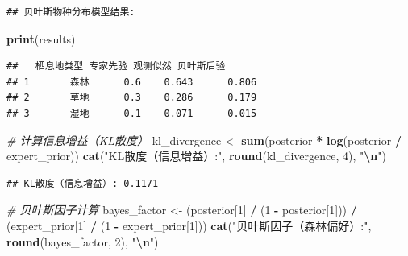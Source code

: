 \documentclass[
]{book}
\newenvironment{Shaded}{\begin{snugshade}}{\end{snugshade}}
\newcommand{\CommentTok}[1]{\textcolor[rgb]{0.56,0.35,0.01}{\textit{#1}}}
\newcommand{\DecValTok}[1]{\textcolor[rgb]{0.00,0.00,0.81}{#1}}
\newcommand{\FunctionTok}[1]{\textcolor[rgb]{0.13,0.29,0.53}{\textbf{#1}}}
\newcommand{\NormalTok}[1]{#1}
\newcommand{\OtherTok}[1]{\textcolor[rgb]{0.56,0.35,0.01}{#1}}
\newcommand{\SpecialCharTok}[1]{\textcolor[rgb]{0.81,0.36,0.00}{\textbf{#1}}}
\newcommand{\StringTok}[1]{\textcolor[rgb]{0.31,0.60,0.02}{#1}}
\begin{document}
\begin{verbatim}
## 贝叶斯物种分布模型结果:
\end{verbatim}

\begin{Shaded}
\begin{Highlighting}[]
\FunctionTok{print}\NormalTok{(results)}
\end{Highlighting}
\end{Shaded}

\begin{verbatim}
##   栖息地类型 专家先验 观测似然 贝叶斯后验
## 1       森林      0.6    0.643      0.806
## 2       草地      0.3    0.286      0.179
## 3       湿地      0.1    0.071      0.015
\end{verbatim}

\begin{Shaded}
\begin{Highlighting}[]
\CommentTok{\# 计算信息增益（KL散度）}
\NormalTok{kl\_divergence }\OtherTok{\textless{}{-}} \FunctionTok{sum}\NormalTok{(posterior }\SpecialCharTok{*} \FunctionTok{log}\NormalTok{(posterior }\SpecialCharTok{/}\NormalTok{ expert\_prior))}
\FunctionTok{cat}\NormalTok{(}\StringTok{"KL散度（信息增益）:"}\NormalTok{, }\FunctionTok{round}\NormalTok{(kl\_divergence, }\DecValTok{4}\NormalTok{), }\StringTok{"}\SpecialCharTok{\textbackslash{}n}\StringTok{"}\NormalTok{)}
\end{Highlighting}
\end{Shaded}

\begin{verbatim}
## KL散度（信息增益）: 0.1171
\end{verbatim}

\begin{Shaded}
\begin{Highlighting}[]
\CommentTok{\# 贝叶斯因子计算}
\NormalTok{bayes\_factor }\OtherTok{\textless{}{-}}\NormalTok{ (posterior[}\DecValTok{1}\NormalTok{] }\SpecialCharTok{/}\NormalTok{ (}\DecValTok{1} \SpecialCharTok{{-}}\NormalTok{ posterior[}\DecValTok{1}\NormalTok{])) }\SpecialCharTok{/}\NormalTok{ (expert\_prior[}\DecValTok{1}\NormalTok{] }\SpecialCharTok{/}\NormalTok{ (}\DecValTok{1} \SpecialCharTok{{-}}\NormalTok{ expert\_prior[}\DecValTok{1}\NormalTok{]))}
\FunctionTok{cat}\NormalTok{(}\StringTok{"贝叶斯因子（森林偏好）:"}\NormalTok{, }\FunctionTok{round}\NormalTok{(bayes\_factor, }\DecValTok{2}\NormalTok{), }\StringTok{"}\SpecialCharTok{\textbackslash{}n}\StringTok{"}\NormalTok{)}
\end{Highlighting}
\end{Shaded}
\end{document}
